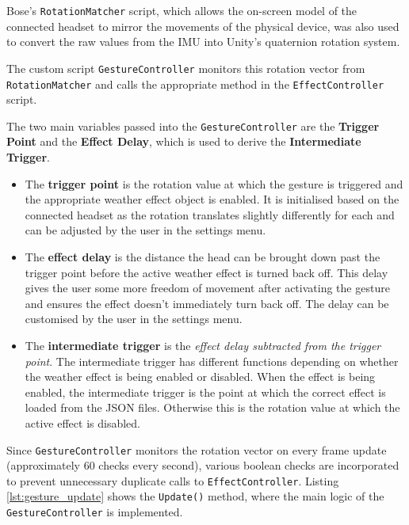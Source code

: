 \documentclass{l4proj}
\begin{document}
Bose's \texttt{RotationMatcher} script, which allows the on-screen model of the connected headset to mirror the movements of the physical device, was also used to convert the raw values from the IMU into Unity's quaternion rotation system.

The custom script \texttt{GestureController} monitors this rotation vector from \texttt{RotationMatcher} and calls the appropriate method in the \texttt{EffectController} script.

The two main variables passed into the \texttt{GestureController} are the \textbf{Trigger Point} and the \textbf{Effect Delay}, which is used to derive the \textbf{Intermediate Trigger}. 
\begin{itemize}
    \item The \textbf{trigger point} is the rotation value at which the gesture is triggered and the appropriate weather effect object is enabled. It is initialised based on the connected headset as the rotation translates slightly differently for each and can be adjusted by the user in the settings menu.
    \item The \textbf{effect delay} is the distance the head can be brought down past the trigger point before the active weather effect is turned back off. This delay gives the user some more freedom of movement after activating the gesture and ensures the effect doesn't immediately turn back off. The delay can be customised by the user in the settings menu.
    \item The \textbf{intermediate trigger} is the \emph{effect delay subtracted from the trigger point}. The intermediate trigger has different functions depending on whether the weather effect is being enabled or disabled. When the effect is being enabled, the intermediate trigger is the point at which the correct effect is loaded from the JSON files. Otherwise this is the rotation value at which the active effect is disabled.
\end{itemize}

Since \texttt{GestureController} monitors the rotation vector on every frame update (approximately 60 checks every second), various boolean checks are incorporated to prevent unnecessary duplicate calls to \texttt{EffectController}. Listing \ref{lst:gesture_update} shows the \texttt{Update()} method, where the main logic of the \texttt{GestureController} is implemented.
\end{document}
